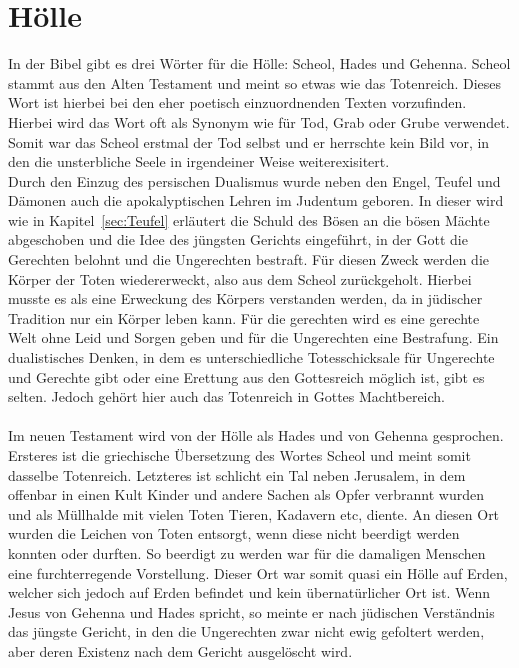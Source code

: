 \section{Hölle}
In der Bibel gibt es drei Wörter für die Hölle: Scheol, Hades und Gehenna. Scheol stammt aus den Alten Testament und meint so etwas wie das Totenreich.
Dieses Wort ist hierbei bei den eher poetisch einzuordnenden Texten vorzufinden. Hierbei wird das Wort oft als Synonym wie für Tod, Grab oder Grube verwendet.
Somit war das Scheol erstmal der Tod selbst und er herrschte kein Bild vor, in den die unsterbliche Seele in irgendeiner Weise weiterexisitert.
\\
Durch den Einzug des persischen Dualismus wurde neben den Engel, Teufel und Dämonen auch die apokalyptischen Lehren im Judentum geboren. In dieser
wird wie in Kapitel\ \ref{sec:Teufel} erläutert die Schuld des Bösen an die bösen Mächte abgeschoben und die Idee des jüngsten Gerichts eingeführt,
in der Gott die Gerechten belohnt und die Ungerechten bestraft. Für diesen Zweck werden die Körper der Toten wiedererweckt, also aus dem Scheol zurückgeholt.
Hierbei musste es als eine Erweckung des Körpers verstanden werden, da in jüdischer Tradition nur ein Körper leben kann. Für die gerechten
wird es eine gerechte Welt ohne Leid und Sorgen geben und für die Ungerechten eine Bestrafung. Ein dualistisches Denken, in dem es unterschiedliche Totesschicksale für Ungerechte und Gerechte gibt oder eine Erettung aus den Gottesreich möglich ist, gibt es selten.  Jedoch gehört hier auch das Totenreich in Gottes Machtbereich.
\\~\\
Im neuen Testament wird von der Hölle als Hades und von Gehenna gesprochen. Ersteres ist die griechische Übersetzung des Wortes Scheol und meint somit dasselbe Totenreich. Letzteres ist schlicht ein Tal neben Jerusalem, in dem offenbar in einen Kult Kinder und andere Sachen als Opfer verbrannt wurden und als Müllhalde mit vielen Toten Tieren, Kadavern etc, diente. An diesen Ort wurden die Leichen von Toten entsorgt, wenn diese nicht beerdigt werden konnten
oder durften. So beerdigt zu werden war für die damaligen Menschen eine furchterregende Vorstellung. Dieser Ort war somit quasi ein \glqq Hölle auf Erden\grqq{}, welcher sich jedoch auf Erden befindet und kein übernatürlicher Ort ist. Wenn Jesus von Gehenna und Hades spricht, so meinte er nach jüdischen Verständnis das jüngste Gericht, in den die Ungerechten zwar nicht ewig gefoltert werden, aber deren Existenz nach dem Gericht ausgelöscht wird.